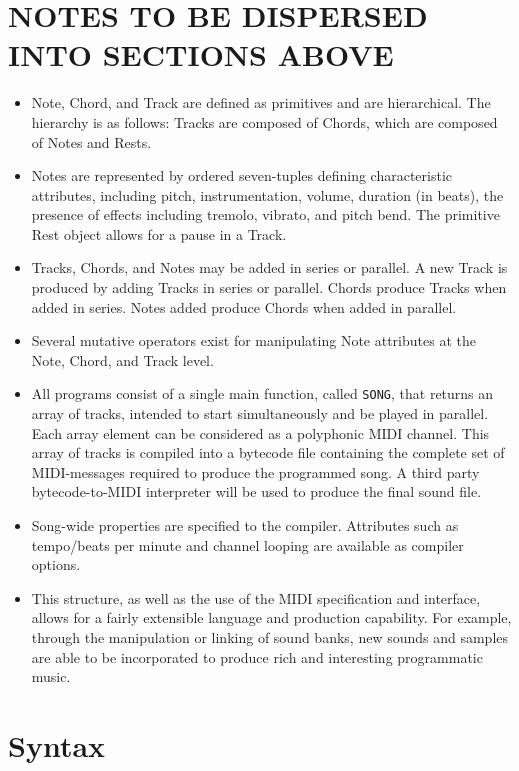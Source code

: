 \documentclass[letterpaper]{article}
\begin{document}
\section{NOTES TO BE DISPERSED INTO SECTIONS ABOVE}

\begin{itemize}
\item
Note, Chord, and Track are defined as primitives and are hierarchical. The hierarchy is as follows: Tracks are composed of Chords, which are composed of Notes and Rests.
\item
Notes are represented by ordered seven-tuples defining characteristic attributes, including pitch, instrumentation, volume, duration (in beats), the presence of effects including tremolo, vibrato, and pitch bend. The primitive Rest object allows for a pause in a Track.
\item
Tracks, Chords, and Notes may be added in series or parallel. A new Track is produced by adding Tracks in series or parallel. Chords produce Tracks when added in series. Notes added produce Chords when added in parallel.
\item
Several mutative operators exist for manipulating Note attributes at the Note, Chord, and Track level.
\item
All programs consist of a single main function, called \texttt{SONG}, that returns an array of tracks, intended to start simultaneously and be played in parallel. Each array element can be considered as a polyphonic MIDI channel. This array of tracks is compiled into a bytecode file containing the complete set of MIDI-messages required to produce the programmed song. A third party bytecode-to-MIDI interpreter will be used to produce the final sound file.
\item
Song-wide properties are specified to the compiler. Attributes such as tempo/beats per minute and channel looping are available as compiler options.
\item
This structure, as well as the use of the MIDI specification and interface, allows for a fairly extensible language and production capability. For example, through the manipulation or linking of sound banks, new sounds and samples are able to be incorporated to produce rich and interesting programmatic music.
\end{itemize}

\section{Syntax}
\end{document}
